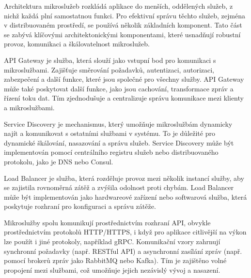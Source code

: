 
Architektura mikroslužeb rozkládá aplikace do menších, oddělených služeb, z nichž každá plní samostatnou funkci. Pro efektivní správu těchto služeb, zejména v distribuovaném prostředí, se používá několik základních komponent. Tato část se zabývá klíčovými architektonickými komponentami, které usnadňují robustní provoz, komunikaci a škálovatelnost mikroslužeb.


API Gateway je služba, která slouží jako vstupní bod pro komunikaci s mikroslužbami. Zajišťuje směrování požadavků, autentizaci, autorizaci, zabezpečení a další funkce, které jsou společné pro všechny služby. API Gateway může také poskytovat další funkce, jako jsou cachování, transformace zpráv a řízení toku dat. Tím zjednodušuje a centralizuje správu komunikace mezi klienty a mikroslužbami.



Service Discovery je mechanismus, který umožňuje mikroslužbám dynamicky najít a komunikovat s ostatními službami v systému. To je důležité pro dynamické škálování, nasazování a správu služeb. Service Discovery může být implementován pomocí centrálního registru služeb nebo distribuovaného protokolu, jako je DNS nebo Consul.



Load Balancer je služba, která rozděluje provoz mezi několik instancí služby, aby se zajistila rovnoměrná zátěž a zvýšila odolnost proti chybám. Load Balancer může být implementován jako hardwareové zařízení nebo softwarová služba, která poskytuje rozhraní pro konfiguraci a správu zátěže.



Mikroslužby spolu komunikují prostřednictvím rozhraní API, obvykle prostřednictvím protokolů HTTP/HTTPS, i když pro aplikace citlivější na výkon lze použít i jiné protokoly, například gRPC. Komunikační vzory zahrnují synchronní požadavky (např. RESTful API) a asynchronní zasílání zpráv (např. pomocí brokerů zpráv jako RabbitMQ nebo Kafka). Tím je zajištěno volné propojení mezi službami, což umožňuje jejich nezávislý vývoj a nasazení.

